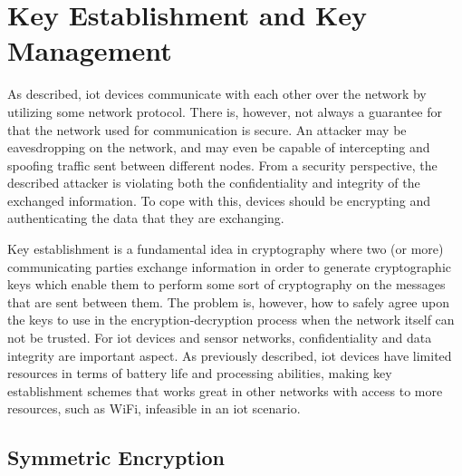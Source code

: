 

\section{Key Establishment and Key Management}
\label{sec:keyestablishment}

As described, \gls{iot} devices communicate with each other over the network by utilizing some network protocol. There is, however, not always a guarantee for that the network used for communication is secure. An attacker may be eavesdropping on the network, and may even be capable of intercepting and spoofing traffic sent between different nodes. From a security perspective, the described attacker is violating both the confidentiality and integrity of the exchanged information. To cope with this, devices should be encrypting and authenticating the data that they are exchanging. 



Key establishment is a fundamental idea in cryptography where two (or more) communicating parties exchange information in order to generate cryptographic keys which enable them to perform some sort of cryptography on the messages that are sent between them. The problem is, however, how to safely agree upon the keys to use in the encryption-decryption process when the network itself can not be trusted. For \gls{iot} devices and sensor networks, confidentiality and data integrity are important aspect. As previously described, \gls{iot} devices have limited resources in terms of battery life and processing abilities, making key establishment schemes that works great in other networks with access to more resources, such as WiFi, infeasible in an \gls{iot} scenario.


\subsection{Symmetric Encryption}

